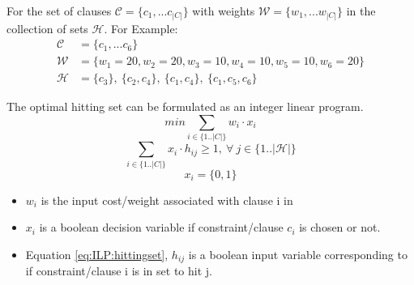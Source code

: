 \documentclass{article}
\newcommand\m[1]{\mathcal{#1}}
\begin{document}


\newpage
For the set of clauses $ \m{C} = \{c_1, ... c_{|C|}\}$ with weights $\m{W} = \{w_1, ... w_{|C|}\}$ in the collection of sets $\m{H}$. For Example:
\begin{equation} \label{mip:example}
  \begin{split}
    \m{C} &= \{c_1, ... c_6 \}  \\
    \m{W} &= \{w_1 = 20, w_2 = 20,  w_3 = 10,  w_4 = 10,  w_5 = 10,  w_6 = 20\} \\
    \m{H} &= \{c_3 \},\ \{c_2, c_4\},\ \{c_1, c_4\},\ \{c_1, c_5, c_6\} 
  \end{split}
  \end{equation}


The optimal hitting set can be formulated as an integer linear program.
\begin{equation} \label{eq:ILP:objective}
  min \sum_{ i \in \{1..|C|\}} w_i \cdot x_i
\end{equation}
\begin{equation} \label{eq:ILP:hittingset}
  \sum_{i \in \{1..|C|\}} x_i \cdot h_{ij} \geq 1, \  \forall \ j \in \{1..|\m{H}|\}
\end{equation}
\begin{equation} \label{eq:ILP:bool:xi}
  x_i = \{0,1\}
\end{equation}
\begin{itemize}
  \item $w_i$ is the input cost/weight associated with clause i in
  \item $x_i$ is a boolean decision variable if constraint/clause $c_i$ is chosen or not.
  \item Equation \ref{eq:ILP:hittingset}, $h_{ij}$ is a boolean input variable corresponding to if constraint/clause i is in set to hit j.
\end{itemize}
\end{document}
